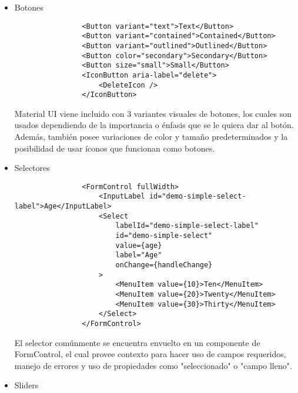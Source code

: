 \begin{itemize}
  \item Botones

        \begin{lstlisting}
                <Button variant="text">Text</Button>
                <Button variant="contained">Contained</Button>
                <Button variant="outlined">Outlined</Button>
                <Button color="secondary">Secondary</Button>
                <Button size="small">Small</Button>
                <IconButton aria-label="delete">
                    <DeleteIcon />
                </IconButton>
            \end{lstlisting}

        Material UI viene incluido con 3 variantes visuales de botones, los cuales son usados dependiendo de la importancia o énfasis que se le quiera dar al botón. Además, también posee variaciones de color y tamaño predeterminados y la posibilidad de usar íconos que funcionan como botones.

  \item Selectores

        \begin{lstlisting}
                <FormControl fullWidth>
                    <InputLabel id="demo-simple-select-label">Age</InputLabel>
                    <Select
                        labelId="demo-simple-select-label"
                        id="demo-simple-select"
                        value={age}
                        label="Age"
                        onChange={handleChange}
                    >
                        <MenuItem value={10}>Ten</MenuItem>
                        <MenuItem value={20}>Twenty</MenuItem>
                        <MenuItem value={30}>Thirty</MenuItem>
                    </Select>
                </FormControl>
            \end{lstlisting}

        El selector comúnmente se encuentra envuelto en un componente de FormControl, el cual provee contexto para hacer uso de campos requeridos, manejo de errores y uso de propiedades como "seleccionado" o "campo lleno".

  \item Sliders


\end{itemize}
